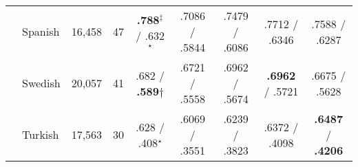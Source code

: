 \begin{table}[ht]
\begin{flushleft}
\begin{tabular}{|@{ }l@{ }|@{ }l@{ }|@{ }l@{ }|@{ }l@{ }|@{ }c@{ }|@{ }c@{ }|@{ }c@{ }|@{ }c@{ }|@{ }c@{ }|}
        & Spanish    & 16,458  & 47   & {\bf.788}$^\ddagger$ / .632$^\star$          & .7086 / .5844 & .7479 / .6086  & .7712 / .6346     & .7588 / .6287 \\
        & Swedish    & 20,057  & 41   & .682 / {\bf.589}$\dagger$        & .6721 / .5558 & .6962 / .5674  & {\bf.6962} / .5721     & .6675 / .5628 \\
        & Turkish    & 17,563  & 30   & .628 / .408$^\star$        & .6069 / .3551 & .6239 / .3823  & .6372 / .4098 & {\bf.6487} / {\bf.4206} \\ \hline %
    \end{tabular}
  \end{flushleft}
\end{table}
